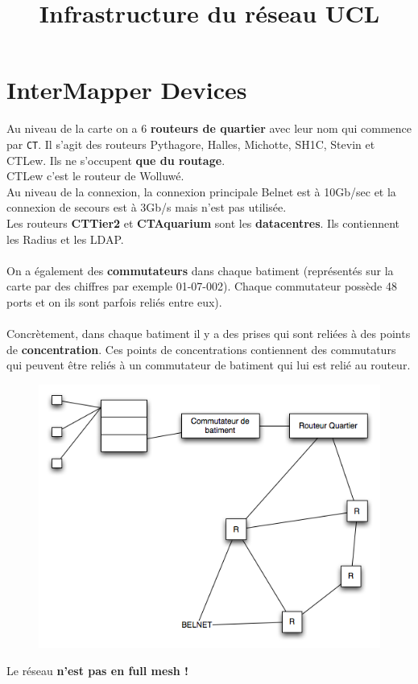 \documentclass[10pt,a4paper]{article}
\title{Infrastructure du réseau UCL}
\begin{document}
\maketitle
\section{InterMapper Devices}
Au niveau de la carte on a 6 \textbf{routeurs de quartier} avec leur nom qui commence par \texttt{CT}. Il s'agit des routeurs Pythagore, Halles, Michotte, SH1C, Stevin et CTLew. Ils ne s'occupent \textbf{que du routage}.\\
CTLew c'est le routeur de Wolluwé.\\
Au niveau de la connexion, la connexion principale Belnet est à 10Gb/sec et la connexion de secours est à 3Gb/s mais n'est pas utilisée.\\
Les routeurs \textbf{CTTier2} et \textbf{CTAquarium} sont les \textbf{datacentres}. Ils contiennent les Radius et les LDAP.\\\\
On a également des \textbf{commutateurs} dans chaque batiment (représentés sur la carte par des chiffres par exemple 01-07-002). Chaque commutateur possède 48 ports et on ils sont parfois reliés entre eux).\\\\

Concrètement, dans chaque batiment il y a des prises qui sont reliées à des points de \textbf{concentration}. Ces points de concentrations contiennent des commutaturs qui peuvent être reliés à un commutateur de batiment qui lui est relié au routeur.
\begin{figure}[h!]
   \includegraphics[scale=0.5]{images/infrastructure/infrastructure.png}
\end{figure}
Le réseau \textbf{n'est pas en full mesh !}\\
\end{document}
